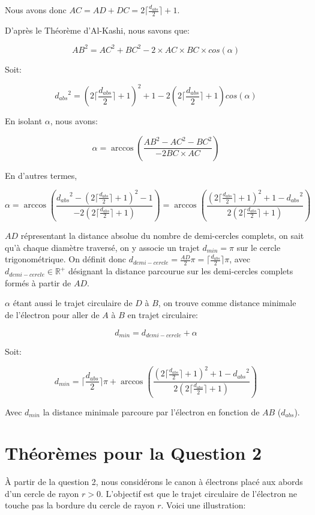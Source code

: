\documentclass[a4paper]{amsart}
\theoremstyle{definition}
\theoremstyle{remark}
\numberwithin{equation}{section}
\begin{document}
Nous avons donc $AC=AD+DC=2\lceil\frac{d_{abs}}{2}\rceil+1$.

D'après le Théorème d'Al-Kashi, nous savons que:

\[AB^2=AC^2+BC^2-2\times AC \times BC \times cos(\alpha)\]

Soit:

\[{d_{abs}}^2=(2\lceil\frac{d_{abs}}{2}\rceil+1)^2 +1 -2(2\lceil\frac{d_{abs}}{2}\rceil+1) cos(\alpha)\]

En isolant $\alpha$, nous avons:

\[\alpha=\arccos(\frac{AB^2-AC^2-BC^2}{-2BC\times AC})\]

En d'autres termes,

\[\alpha=\arccos(\frac{{d_{abs}}^2 -(2\lceil\frac{d_{abs}}{2}\rceil+1)^2-1}{-2(2\lceil\frac{d_{abs}}{2}\rceil+1)})=\arccos(\frac{(2\lceil\frac{d_{abs}}{2}\rceil+1)^2+1 -{d_{abs}}^2}{2(2\lceil\frac{d_{abs}}{2}\rceil+1)})\]

$AD$ répresentant la distance absolue du nombre de demi-cercles complets, on sait qu'à chaque diamètre traversé, on y associe un trajet $d_{min}=\pi$ sur le cercle trigonométrique. On définit donc $d_{demi-cercle}=\frac{AD}{2}\pi=\lceil \frac{d_{abs}}{2} \rceil\pi$, avec $d_{demi-cercle}\in\mathbb{R^+}$ désignant la distance parcourue sur les demi-cercles complets formés à partir de $AD$.

$\alpha$ étant aussi le trajet circulaire de $D$ à $B$, on trouve comme distance minimale de l'électron pour aller de $A$ à $B$ en trajet circulaire:

\[d_{min}=d_{demi-cercle}+ \alpha\]

Soit:

\[d_{min}= \lceil\frac{d_{abs}}{2}\rceil\pi + \arccos(\frac{(2\lceil\frac{d_{abs}}{2}\rceil+1)^2+1 -{d_{abs}}^2}{2(2\lceil\frac{d_{abs}}{2}\rceil+1)})\]

Avec $d_{min}$ la distance minimale parcoure par l'électron en fonction de $AB$ ($d_{abs}$).

\section{Théorèmes pour la Question 2}

À partir de la question 2, nous considérons le canon à électrons placé aux abords d'un cercle de rayon $r>0$. L'objectif est que le trajet circulaire de l'électron ne touche pas la bordure du cercle de rayon $r$. Voici une illustration:
\end{document}
